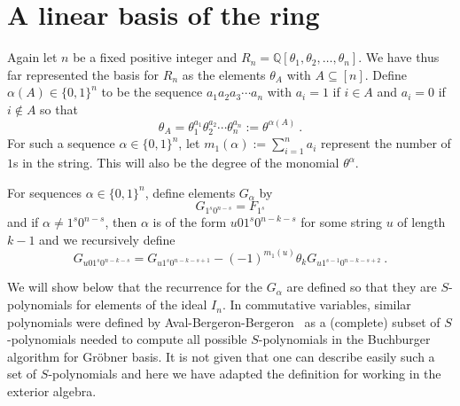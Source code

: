 \documentclass[11pt]{amsart}
\theoremstyle{definition}
\numberwithin{equation}{section}
\begin{document}
\section{A linear basis of the ring}

Again let $n$ be a fixed positive integer and $R_n = {\mathbb Q}[\theta_1, \theta_2, \ldots, \theta_n]$.
We have thus far represented the basis for
$R_n$ as the elements $\theta_A$ with $A \subseteq [n]$.  Define $\alpha(A) \in \{ 0,1\}^n$ to be
the sequence $a_1 a_2 a_3 \cdots a_n$ with $a_i = 1$ if $i \in A$ and
$a_i = 0$ if $i \notin A$ so that
\[
\theta_A = \theta_1^{a_1} \theta_2^{a_2} \cdots \theta_n^{a_n} := \theta^{\alpha(A)}~.
\]
For such a sequence $\alpha \in \{0,1\}^n$, let $m_1(\alpha) := \sum_{i=1}^n a_i$
represent the number of $1$s in the string.  This will also be the degree of the monomial
$\theta^{\alpha}$.

For sequences $\alpha \in \{ 0, 1 \}^n$, define elements $G_\alpha$ by
\begin{equation}\label{eq:Gdef1}
G_{1^s0^{n-s}} = F_{1^s}
\end{equation}
and if $\alpha \neq 1^s 0^{n-s}$, then $\alpha$ is of the form $u01^s0^{n-k-s}$ for some string $u$
of length $k-1$ and we recursively define
\begin{equation}\label{eq:Gdef2}
G_{u01^s0^{n-k-s}} = G_{u1^s0^{n-k-s+1}} - (-1)^{m_1(u)} \theta_k G_{u1^{s-1}0^{n-k-s+2}}~.
\end{equation}

We will show below that the recurrence for the
$G_\alpha$ are defined so that they are $S$-polynomials \cite{CLO}
for elements of the ideal $I_n$.
In commutative variables, similar polynomials were defined by Aval-Bergeron-Bergeron~\cite{AB,ABB}
as a (complete) subset of $S$-polynomials needed to compute all possible
$S$-polynomials in the Buchburger algorithm for Gr\"obner basis.
It is not given that one can describe easily such a set of $S$-polynomials and here we have adapted
the definition for working in the exterior algebra.
\end{document}
